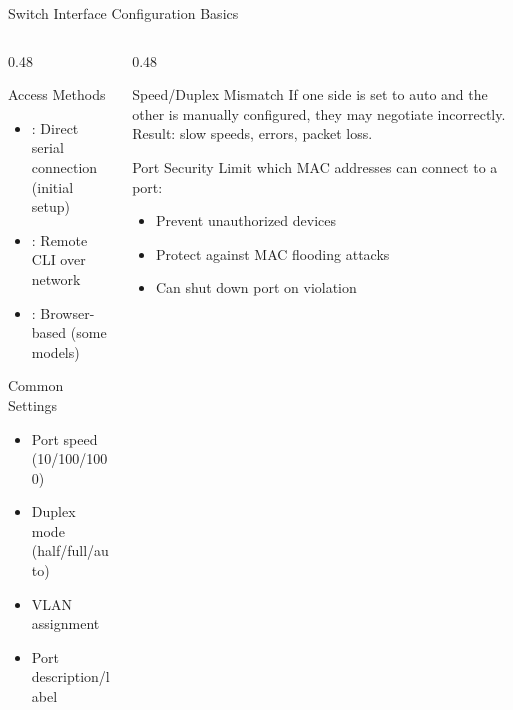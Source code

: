 \documentclass[aspectratio=169]{beamer}  %
\begin{document}
\begin{frame}{Switch Interface Configuration Basics}
    \begin{columns}[T]
        \begin{column}{0.48\textwidth}
            \begin{block}{Access Methods}
                \begin{itemize}
                    \item {}: Direct serial connection (initial setup)
                    \item {}: Remote CLI over network
                    \item {}: Browser-based (some models)
                \end{itemize}
            \end{block}
            
            \vspace{0.3em}
            \begin{block}{Common Settings}
                \begin{itemize}
                    \item Port speed (10/100/1000)
                    \item Duplex mode (half/full/auto)
                    \item VLAN assignment
                    \item Port description/label
                \end{itemize}
            \end{block}
        \end{column}
        \begin{column}{0.48\textwidth}
            \begin{alertblock}{Speed/Duplex Mismatch}
                If one side is set to auto and the other is manually configured, they may negotiate incorrectly. Result: slow speeds, errors, packet loss.
            \end{alertblock}
            
            \vspace{0.3em}
            \begin{exampleblock}{Port Security}
                Limit which MAC addresses can connect to a port:
                \begin{itemize}
                    \item Prevent unauthorized devices
                    \item Protect against MAC flooding attacks
                    \item Can shut down port on violation
                \end{itemize}
            \end{exampleblock}
        \end{column}
    \end{columns}
\end{frame}
\end{document}
